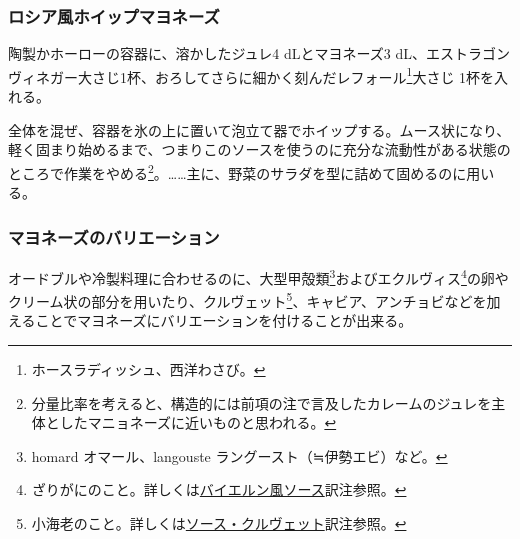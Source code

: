 \begin{recette}
\atoaki{}

\hypertarget{mayonnaise-fouette-a-la-russe}{%
\subsubsection{ロシア風ホイップマヨネーズ}\label{mayonnaise-fouette-a-la-russe}}



陶製かホーローの容器に、溶かしたジュレ4 dLとマヨネーズ3
dL、エストラゴンヴィネガー大さじ1杯、おろしてさらに細かく刻んだレフォール\footnote{ホースラディッシュ、西洋わさび。}大さじ
1杯を入れる。

全体を混ぜ、容器を氷の上に置いて泡立て器でホイップする。ムース状になり、軽く固まり始めるまで、つまりこのソースを使うのに充分な流動性がある状態のところで作業をやめる\footnote{分量比率を考えると、構造的には前項の注で言及したカレームのジュレを主体としたマニョネーズに近いものと思われる。}。\ldots{}\ldots{}主に、野菜のサラダを型に詰めて固めるのに用いる。

\atoaki{}

\hypertarget{mayonnaises-divierses}{%
\subsubsection{マヨネーズのバリエーション}\label{mayonnaises-divierses}}



オードブルや冷製料理に合わせるのに、大型甲殻類\footnote{homard
  オマール、langouste ラングースト（≒伊勢エビ）など。}およびエクルヴィス\footnote{ざりがにのこと。詳しくは\protect\hyperlink{sauce-bavaroise}{バイエルン風ソース}訳注参照。}の卵やクリーム状の部分を用いたり、クルヴェット\footnote{小海老のこと。詳しくは\protect\hyperlink{sauce-aux-crevettes}{ソース・クルヴェット}訳注参照。}、キャビア、アンチョビなどを加えることでマヨネーズにバリエーションを付けることが出来る。


\end{recette}
